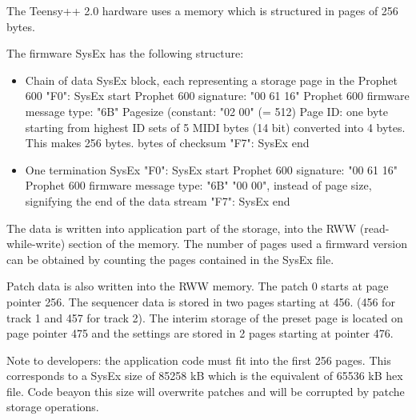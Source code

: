 The Teensy++ 2.0 hardware uses a memory which is structured in pages of 256 bytes.

The firmware SysEx has the following structure:

\begin{itemize}
  \item Chain of data SysEx block, each representing a storage page in the Prophet 600
  \subitem "F0": SysEx start
  \subitem Prophet 600 signature: "00 61 16"
  \subitem Prophet 600 firmware message type: "6B"
  \subitem Pagesize (constant: "02 00" (= 512)
  \subitem Page ID: one byte starting from highest ID
   sets of 5 MIDI bytes (14 bit) converted into 4 bytes. This makes 256 bytes.
   bytes of checksum
  \subitem "F7": SysEx end
  \item One termination SysEx
  \subitem "F0": SysEx start
  \subitem Prophet 600 signature: "00 61 16"
  \subitem Prophet 600 firmware message type: "6B"
  \subitem "00 00", instead of page size, signifying the end of the data stream
  \subitem "F7": SysEx end  
\end{itemize}

The data is written into application part of the storage, into the RWW (read-while-write) section of the memory. The number of pages used a firmward version can be obtained by counting the pages contained in the SysEx file.

Patch data is also written into the RWW memory. The patch 0 starts at page pointer 256. The sequencer data is stored in two pages starting at 456. (456 for track 1 and 457 for track 2). The interim storage of the preset page is located on page pointer 475 and the settings are stored in 2 pages starting at pointer 476.

Note to developers: the application code must fit into the first 256 pages. This corresponds to a SysEx size of 85258 kB which is the equivalent of 65536 kB hex file. Code beayon this size will overwrite patches and will be corrupted by patche storage operations.

